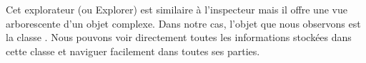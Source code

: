 \documentclass[a4paper,10pt,twoside]{book}
\begin{document}
Cet explorateur (ou Explorer) est similaire à l'inspecteur mais il
offre une vue arborescente d'un objet complexe.
Dans notre cas, l'objet que nous observons est la classe .
Nous pouvons voir directement toutes les informations stockées dans
cette classe et naviguer facilement dans toutes ses parties.




\end{document}
